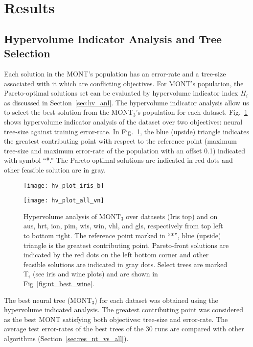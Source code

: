 \documentclass[conference]{IEEEtran}
\begin{document}
\section{Results}
\label{sec:res}
\subsection{Hypervolume Indicator Analysis and Tree Selection}
\label{sec:res_nt_hv}
Each solution in the MONT's population has an error-rate and a tree-size associated with it which are conflicting objectives. For MONT's population, the Pareto-optimal solutions set can be evaluated by hypervolume indicator index $ H_i $ as discussed in Section~\ref{sec:hv_anl}. The hypervolume indicator analysis allow us to select the best solution from the MONT$_3$'s population for each dataset. Fig.~\ref{fig:hv_plots} shows hypervolume indicator analysis of the dataset over two objectives: neural tree-size against training error-rate. In Fig.~\ref{fig:hv_plots}, the blue (upside) triangle indicates the greatest contributing point with respect to the reference point (maximum tree-size and maximum error-rate of the population with an offset 0.1) indicated with symbol ``*.'' The Pareto-optimal solutions are indicated in red dots and other feasible solution are in gray.

\begin{figure}
\centerline{\texttt{[image: hv\_plot\_iris\_b]}}
    
    \centerline{\texttt{[image: hv\_plot\_all\_vn]}}
    
    
    \caption{Hypervolume analysis of MONT$_3$ over datasets (Iris top) and on aus, hrt, ion, pim, wis, win, vhl, and gls, respectively from top left to bottom right. The reference point marked in ``*'', blue (upside) triangle is the greatest contributing point. Pareto-front solutions are indicated by the red dots on the left bottom corner and other feasible solutions are indicated in gray dots. Select trees are marked T$_i$ (see iris and wine plots) and are shown in Fig~\ref{fig:nt_best_wine}.} \label{fig:hv_plots}
\end{figure}

The best neural tree (MONT$_3$) for each dataset was obtained using the hypervolume indicated analysis. The greatest contributing point was considered as the best MONT satisfying both objectives: tree-size and error-rate. The average test error-rates of the best trees of the 30 runs are compared with other algorithms (Section~\ref{sec:res_nt_vs_all}).
\end{document}
